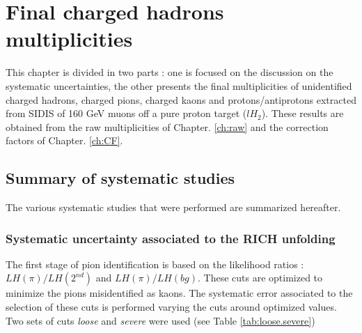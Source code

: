
\chapter{Final charged hadrons multiplicities} %

\label{ch:mult} %


This chapter is divided in two parts : one is focused on the discussion on the systematic uncertainties, the other presents the final multiplicities of unidentified charged hadrons, charged pions, charged kaons and protons/antiprotons extracted from SIDIS of 160 GeV muons off a pure proton target ($lH_2$). These results are obtained from the raw multiplicities of Chapter. \ref{ch:raw} and the correction factors of Chapter. \ref{ch:CF}.


\section{Summary of systematic studies}

The various systematic studies that were performed are summarized hereafter.


\subsection{Systematic uncertainty associated to the RICH unfolding}

The first stage of pion identification is based on the likelihood ratios : $LH(\pi)/LH(2^{nd})$ and $LH(\pi)/LH(bg)$. These cuts are optimized to minimize the
pions misidentified as kaons. The systematic error associated to the selection of these cuts is performed varying the cuts around optimized values. Two sets of
cuts \textit{loose} and \textit{severe} were used (see Table \ref{tab:loose.severe})

